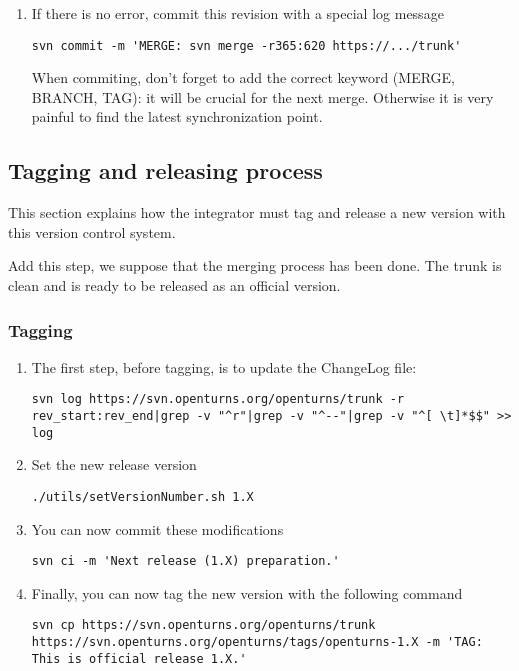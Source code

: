 \begin{enumerate}
In this process, it is required to build and test the developments in a directory SEPARATED from the source directory. So DO make a build subdirectory and DO change do it. It does not take time but it ensures that the building process is correct (you can't check for this when building in the same directory than the sources).
\item If there is no error, commit this revision with a special log message

\begin{lstlisting}
svn commit -m 'MERGE: svn merge -r365:620 https://.../trunk'
\end{lstlisting}

When commiting, don't forget to add the correct keyword (MERGE, BRANCH, TAG): it will be crucial for the next merge. Otherwise it is very painful to find the latest synchronization point.

\end{enumerate}

\subsection{Tagging and releasing process }

This section explains how the integrator must tag and release a new version with this version control system.

Add this step, we suppose that the merging process has been done. The trunk is clean and is ready to be released as an official version.

\subsubsection{Tagging}
\begin{enumerate}
\item The first step, before tagging, is to update the ChangeLog file:
\begin{lstlisting}
svn log https://svn.openturns.org/openturns/trunk -r rev_start:rev_end|grep -v "^r"|grep -v "^--"|grep -v "^[ \t]*$$" >> log
\end{lstlisting}

\item Set the new release version
\begin{lstlisting}
./utils/setVersionNumber.sh 1.X
\end{lstlisting}

\item You can now commit these modifications
\begin{lstlisting}
svn ci -m 'Next release (1.X) preparation.'
\end{lstlisting}

\item Finally, you can now tag the new version with the following command
\begin{lstlisting}
svn cp https://svn.openturns.org/openturns/trunk https://svn.openturns.org/openturns/tags/openturns-1.X -m 'TAG: This is official release 1.X.'
\end{lstlisting}

\end{enumerate}
